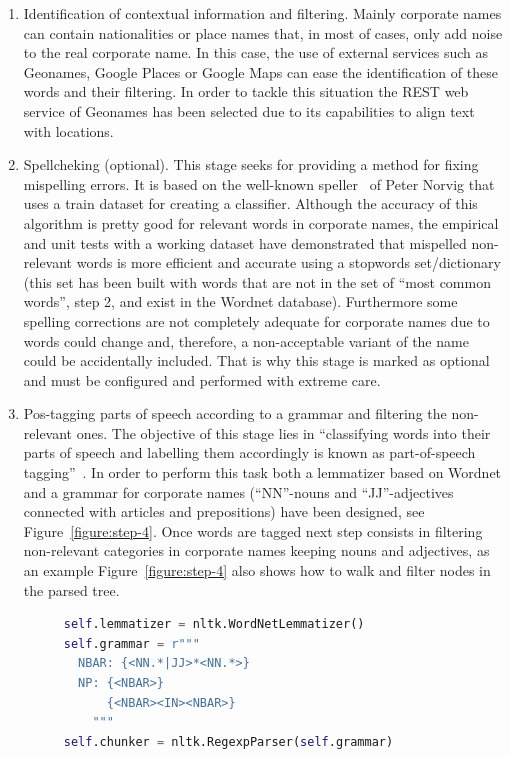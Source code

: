 \documentclass{llncs}
\begin{document}
\begin{enumerate}
\item Identification of contextual information and filtering. Mainly corporate names can contain nationalities or place names that, in most of 
cases, only add noise to the real corporate name. In this case, the use of external services such as Geonames, Google Places 
or Google Maps can ease the identification of these words and their filtering. In order to tackle this situation the REST web service 
of Geonames has been selected due to its capabilities to align text with locations.

\item Spellcheking (optional). This stage seeks for providing a method for fixing mispelling errors. It is based on the 
well-known speller~\cite{NorvigSpelling} of Peter Norvig that uses a train dataset for creating a classifier. Although the accuracy of this 
algorithm is pretty good for relevant words in corporate names, the empirical and unit tests with a working dataset 
have demonstrated that mispelled non-relevant words is more efficient and accurate using a stopwords set/dictionary (this set has been 
built with words that are not in the set of ``most common words'', step 2, and exist in the Wordnet database). Furthermore some spelling corrections 
are not completely adequate for corporate names due to words could change and, therefore, a non-acceptable variant of the name 
could be accidentally included. That is why this stage is marked as optional and must be configured and performed with extreme care.

\item Pos-tagging parts of speech according to a grammar and filtering the non-relevant ones. The objective 
of this stage lies in ``classifying words into their parts of speech and labelling them accordingly is known as part-of-speech tagging''~\cite{LoperBird02}. In order 
to perform this task both a lemmatizer based on Wordnet and a grammar for corporate names (``NN''-nouns and ``JJ''-adjectives connected with articles and 
prepositions) have been designed, see Figure~\ref{figure:step-4}. Once words are tagged next step consists in filtering non-relevant categories 
in corporate names keeping nouns and adjectives, as an example Figure~\ref{figure:step-4} also shows how to walk and filter nodes in the parsed tree.

\begin{figure}[!h]
\begin{center}
\begin{lstlisting}[language=Python]  
self.lemmatizer = nltk.WordNetLemmatizer()
self.grammar = r"""
  NBAR: {<NN.*|JJ>*<NN.*>}   
  NP: {<NBAR>}
      {<NBAR><IN><NBAR>} 
    """
self.chunker = nltk.RegexpParser(self.grammar)


\end{lstlisting}
\end{center}
\end{figure}
\end{enumerate}
\end{document}
